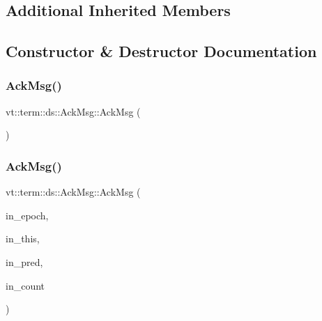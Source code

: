 \subsection*{Additional Inherited Members}


\subsection{Constructor \& Destructor Documentation}
\mbox{\label{structvt_1_1term_1_1ds_1_1_ack_msg_aa455e4d0c3e93b196e8fc21f576a5d3e}} 
\subsubsection{\texorpdfstring{Ack\+Msg()}{AckMsg()}\hspace{0.1cm}{\footnotesize\ttfamily [1/2]}}
{\footnotesize\ttfamily vt\+::term\+::ds\+::\+Ack\+Msg\+::\+Ack\+Msg (\begin{DoxyParamCaption}{ }\end{DoxyParamCaption})\hspace{0.3cm}{\ttfamily [default]}}

\mbox{\label{structvt_1_1term_1_1ds_1_1_ack_msg_afa493ae15ad599ef9ed892ab697345d5}} 
\subsubsection{\texorpdfstring{Ack\+Msg()}{AckMsg()}\hspace{0.1cm}{\footnotesize\ttfamily [2/2]}}
{\footnotesize\ttfamily vt\+::term\+::ds\+::\+Ack\+Msg\+::\+Ack\+Msg (\begin{DoxyParamCaption}\item[{\hyperlink{namespacevt_a985a5adf291c34a3ca263b3378388236}{Epoch\+Type} const \&}]{in\+\_\+epoch,  }\item[{\hyperlink{namespacevt_a866da9d0efc19c0a1ce79e9e492f47e2}{Node\+Type} const \&}]{in\+\_\+this,  }\item[{\hyperlink{namespacevt_a866da9d0efc19c0a1ce79e9e492f47e2}{Node\+Type} const \&}]{in\+\_\+pred,  }\item[{int64\+\_\+t const}]{in\+\_\+count }\end{DoxyParamCaption})\hspace{0.3cm}{\ttfamily [inline]}}



